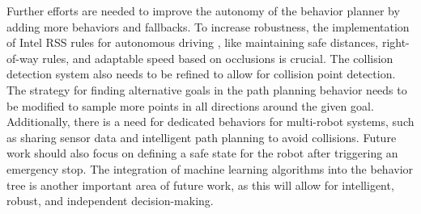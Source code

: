 \documentclass[letterpaper, 10pt, conference]{ieeeconf}
\begin{document}
Further efforts are needed to improve the autonomy of the behavior planner by adding more behaviors and fallbacks. To increase robustness, the implementation of Intel RSS rules for autonomous driving \cite{gassmann2019towards}, like maintaining safe distances, right-of-way rules, and adaptable speed based on occlusions is crucial. The collision detection system also needs to be refined to allow for collision point detection. The strategy for finding alternative goals in the path planning behavior needs to be modified to sample more points in all directions around the given goal. Additionally, there is a need for dedicated behaviors for multi-robot systems, such as sharing sensor data and intelligent path planning to avoid collisions. Future work should also focus on defining a safe state for the robot after triggering an emergency stop. The integration of machine learning algorithms into the behavior tree is another important area of future work, as this will allow for intelligent, robust, and independent decision-making.




\end{document}
